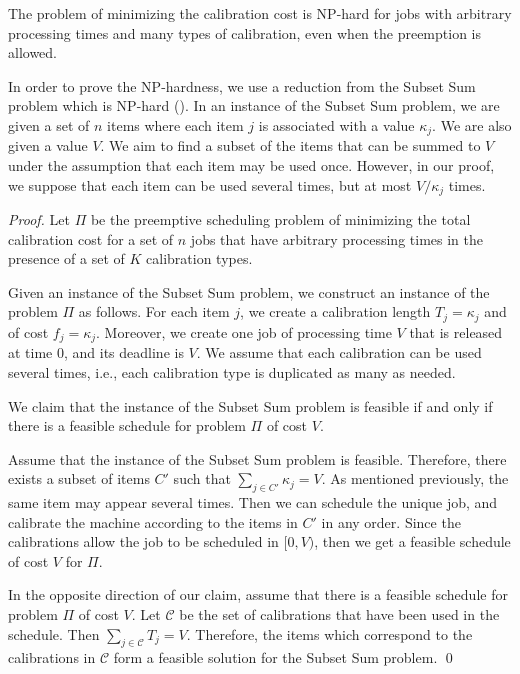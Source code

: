 \begin{prop}    \label{prop_np_hard}
The problem of minimizing the calibration cost is NP-hard for jobs with arbitrary processing times and many types of calibration,
even when the preemption is allowed.
\end{prop}

In order to prove the NP-hardness, we use a reduction from the {\sc Subset Sum} problem which is NP-hard (\cite{johnson1979computers}). In an instance of the {\sc Subset Sum} problem, we are given a set of $n$ items where
each item $j$ is associated with a value $\kappa_j$. We are also given a value $V$. We aim to find a subset of the items that can be summed to $V$ under the assumption that each item may be used once. However, in our proof, we suppose that each item can be used several times, but at most $V/\kappa_j$ times.

\begin{proof}
Let $\Pi$ be the preemptive scheduling problem of minimizing the total calibration cost for a set of $n$ jobs that have arbitrary processing times in the presence of a set of $K$ calibration types.

Given an instance of the {\sc Subset Sum} problem, we construct an instance of the problem $\Pi$ as follows. For each item $j$, we create a calibration length $T_j=\kappa_j$ and of cost $f_j=\kappa_j$. Moreover, we create one job of processing time $V$ that is released at time 0, and its deadline is $V$. We assume that each calibration can be used several times, i.e., each calibration type is duplicated as many as needed.

We claim that the instance of the {\sc Subset Sum} problem is feasible if and only if there is a feasible schedule for problem $\Pi$ of cost $V$.

Assume that the instance of the {\sc Subset Sum} problem is feasible. Therefore, there exists a subset of items $C'$ such that $\sum_{j\in C'}\kappa_j=V$. As mentioned previously, the same item may appear several times. Then we can schedule the unique job, and calibrate the machine according to the items in $C'$ in any order. Since the calibrations allow the job to be scheduled in $[0, V)$, then we get a feasible schedule of cost $V$ for $\Pi$.

In the opposite direction of our claim, assume that there is a feasible schedule for problem $\Pi$ of cost $V$. Let $\mathcal{C}$ be the set of calibrations that have been used in the schedule. Then $\sum_{j\in \mathcal{C}}T_j=V$. Therefore, the items which correspond to the calibrations in $\mathcal{C}$ form a feasible solution for the {\sc Subset Sum} problem. 
\qed\end{proof}

